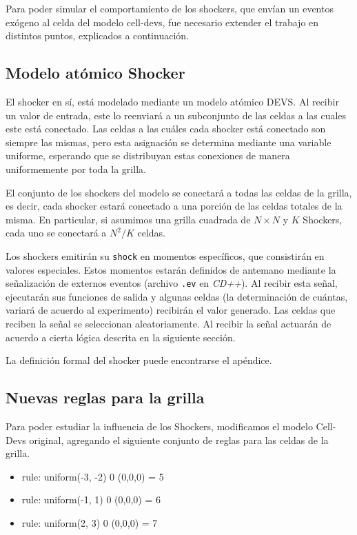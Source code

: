 Para poder simular el comportamiento de los shockers, que envían un eventos exógeno al celda del modelo cell-devs, fue necesario extender el trabajo en distintos puntos, explicados a continuación.

\subsection{Modelo atómico Shocker}

El shocker en sí, está modelado mediante un modelo atómico DEVS. Al recibir un valor de entrada, este lo reenviará a un subconjunto de las celdas a las cuales este está conectado. Las celdas a las cuáles cada shocker está conectado son siempre las mismas, pero esta asignación se determina mediante una variable uniforme, esperando que se distribuyan estas conexiones de manera uniformemente por toda la grilla.

El conjunto de los shockers del modelo se conectará a todas las celdas de la grilla, es decir, cada shocker estará conectado a una porción de las celdas totales de la misma. En particular, si asumimos una grilla cuadrada de $N \times N$ y $K$ Shockers, cada uno se conectará a $N^2/K$ celdas.

Los shockers emitirán su \texttt{shock} en momentos específicos, que consistirán en valores especiales. Estos momentos estarán definidos de antemano mediante la señalización de externos eventos (archivo \texttt{.ev} en \textit{CD++}). Al recibir esta señal, ejecutarán sus funciones de salida y algunas celdas (la determinación de cuántas, variará de acuerdo al experimento) recibirán el valor generado. Las celdas que reciben la señal se seleccionan aleatoriamente. Al recibir la señal actuarán de acuerdo a cierta lógica descrita en la siguiente sección.

La definición formal del shocker puede encontrarse el apéndice.

\subsection{Nuevas reglas para la grilla}

Para poder estudiar la influencia de los Shockers, modificamos el modelo Cell-Devs original, agregando el siguiente conjunto de reglas para las celdas de la grilla.

\begin{itemize}
    \item rule: {  uniform(-3, -2) } 0 { (0,0,0) = 5 }
    \item rule: {  uniform(-1, 1)  } 0 { (0,0,0) = 6 }
    \item rule: {  uniform(2, 3) } 0 { (0,0,0) = 7 } 
\end{itemize}

